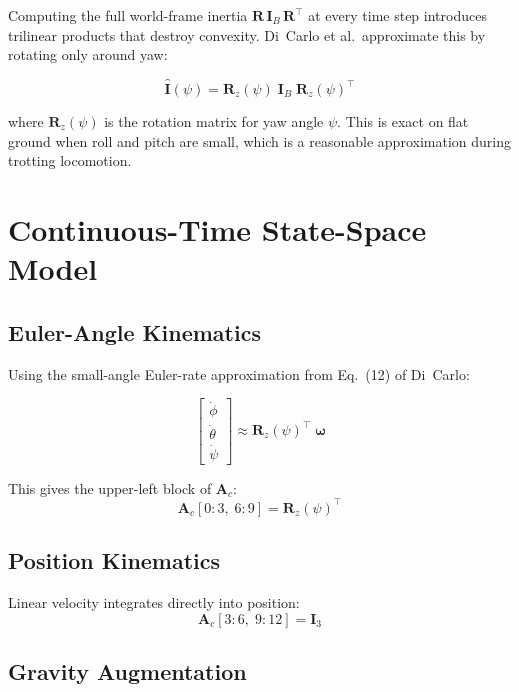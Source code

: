 \documentclass[12pt,a4paper]{report}
\newcommand{\vect}[1]{\bm{#1}}
\newcommand{\mat}[1]{\mathbf{#1}}
\begin{document}
Computing the full world-frame inertia $\mat{R}\,\mat{I}_B\,\mat{R}^\top$
at every time step introduces trilinear products that destroy convexity.
Di~Carlo et al.\ approximate this by rotating only around yaw:

\begin{equation}
    \hat{\mat{I}}(\psi) = \mat{R}_z(\psi)\;\mat{I}_B\;\mat{R}_z(\psi)^\top
    \label{eq:inertia_approx}
\end{equation}

where $\mat{R}_z(\psi)$ is the rotation matrix for yaw angle $\psi$.
This is exact on flat ground when roll and pitch are small, which is a
reasonable approximation during trotting locomotion.

\section{Continuous-Time State-Space Model}

\subsection{Euler-Angle Kinematics}

Using the small-angle Euler-rate approximation from Eq.~(12) of Di~Carlo:

\begin{equation}
    \begin{bmatrix}\dot\phi \\ \dot\theta \\ \dot\psi\end{bmatrix}
    \approx \mat{R}_z(\psi)^\top\;\vect{\omega}
\end{equation}

This gives the upper-left block of $\mat{A}_c$:
\begin{equation}
    \mat{A}_c[0\!:\!3,\; 6\!:\!9] = \mat{R}_z(\psi)^\top
\end{equation}

\subsection{Position Kinematics}

Linear velocity integrates directly into position:
\begin{equation}
    \mat{A}_c[3\!:\!6,\; 9\!:\!12] = \mat{I}_3
\end{equation}

\subsection{Gravity Augmentation}
\end{document}
